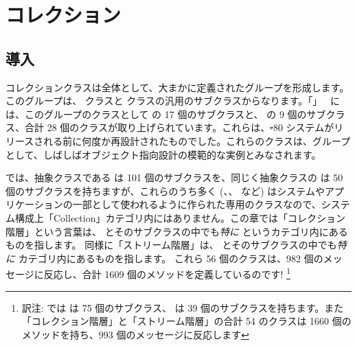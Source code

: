 \documentclass[a4paper,10pt,twoside]{book}
\begin{document}
	\sloppy
\fi
\chapter{コレクション}


\section{導入}

コレクションクラスは全体として、大まかに定義されたグループを形成します。このグループは、 クラスと  クラスの汎用のサブクラスからなります。「」~\cite{Gold83a} には、このグループのクラスとして  の 17 個のサブクラスと、 の 9 個のサブクラス、合計 28 個のクラスが取り上げられています。これらは、\st-80 システムがリリースされる前に何度か再設計されたものでした。これらのクラスは、グループとして、しばしばオブジェクト指向設計の模範的な実例とみなされます。

\pharo では、抽象クラスである  は 101 個のサブクラスを、同じく抽象クラスの  は 50 個のサブクラスを持ちますが、これらのうち多く (\mbox{、}\mbox{、} など) はシステムやアプリケーションの一部として使われるように作られた専用のクラスなので、システム構成上「Collection」カテゴリ内にはありません。この章では「コレクション階層」という言葉は、 とそのサブクラスの中でも\emph{特に}   というカテゴリ内にあるものを指します。
同様に「ストリーム階層」は、  とそのサブクラスの中でも\emph{特に}  カテゴリ内にあるものを指します。
これら 56 個のクラスは、982 個のメッセージに反応し、合計 1609 個のメソッドを定義しているのです! \footnote{訳注:  では は 75 個のサブクラス、 は 39 個のサブクラスを持ちます。また「コレクション階層」と「ストリーム階層」の合計 54 のクラスは 1660 個のメソッドを持ち、993 個のメッセージに反応します}
\end{document}

